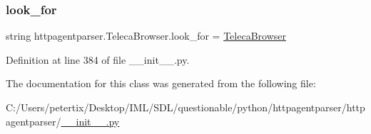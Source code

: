 \subsubsection{\texorpdfstring{look\+\_\+for}{look\_for}}
{\footnotesize\ttfamily string httpagentparser.\+Teleca\+Browser.\+look\+\_\+for = \textquotesingle{}\hyperlink{classhttpagentparser_1_1_teleca_browser}{Teleca\+Browser}\textquotesingle{}\hspace{0.3cm}{\ttfamily [static]}}



Definition at line 384 of file \+\_\+\+\_\+init\+\_\+\+\_\+.\+py.



The documentation for this class was generated from the following file\+:\begin{DoxyCompactItemize}
\item 
C\+:/\+Users/petertix/\+Desktop/\+I\+M\+L/\+S\+D\+L/questionable/python/httpagentparser/httpagentparser/\hyperlink{____init_____8py}{\+\_\+\+\_\+init\+\_\+\+\_\+.\+py}\end{DoxyCompactItemize}
